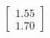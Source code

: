 \documentclass[preview]{standalone}
\begin{document}
\begin{align*}
\begin{bmatrix} 1.55 \\ 1.70 \end{bmatrix}
\end{align*}
\end{document}
